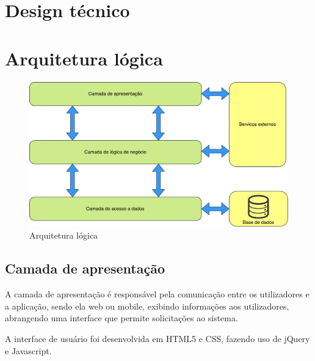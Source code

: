 \newpage












\section{Design técnico}


\newpage
\section{Arquitetura lógica}



\begin{figure}[!htb]
	\centering
	\includegraphics[width=\linewidth]{esquemas/arquitetura-logica.pdf}
	\caption{Arquitetura lógica}
	\label{opencvlogo}
\end{figure}



\subsection{Camada de apresentação}


A camada de apresentação é responsável pela comunicação entre os utilizadores e a aplicação, sendo ela web ou mobile, exibindo informações aos utilizadores, abrangendo uma interface que permite solicitações ao sistema.


A interface de usuário foi desenvolvida em HTML5 e CSS, fazendo uso de jQuery e Javascript.



